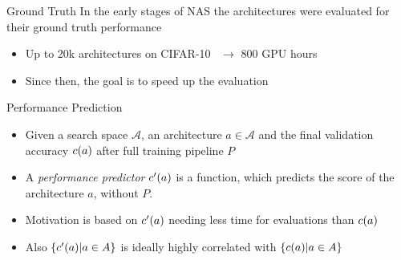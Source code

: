\documentclass[main]{subfiles}
\begin{document}
\begin{frame}{Ground Truth}
In the early stages of NAS the architectures were evaluated for their ground truth performance ~
\begin{itemize}
    \item Up to 20k architectures on CIFAR-10~ $\rightarrow$ 800 GPU hours
     \pause
    \item Since then, the goal is to speed up the evaluation
\end{itemize}
\end{frame}

\begin{frame}{Performance Prediction}
\begin{itemize}
    \item Given a search space $\mathcal{A}$, an architecture $a \in \mathcal{A}$ and the final validation accuracy $c(a)$ after full training pipeline $P$
    \pause
    \item A \textit{performance predictor} $c'(a)$ is a function, which predicts the score of the architecture $a$, without $P$. 
     \pause
    \item Motivation is based on $c'(a)$ needing less time for evaluations than $c(a)$
     \pause
    \item Also $\{c'(a) \vert a \in A\}$ is ideally highly correlated with  $\{c(a) \vert a \in A\}$
\end{itemize}
\end{frame}
\end{document}

